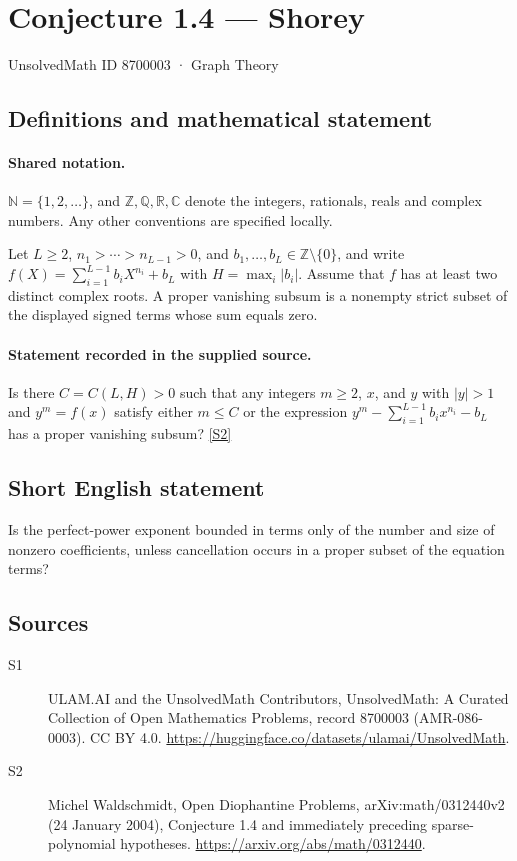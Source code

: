 \documentclass[11pt]{article}
\newcommand{\sref}[2]{\hyperlink{source:#1:#2}{[S#2]}}
\begin{document}
\setcounter{section}{8700002}
\section{Conjecture 1.4 — Shorey}\label{8700003}
{\small\sffamily UnsolvedMath ID 8700003 · Graph Theory}
\subsection{Definitions and mathematical statement}

\paragraph{Shared notation.}$\mathbb N=\{1,2,\ldots\}$, and $\mathbb Z,\mathbb Q,\mathbb R,\mathbb C$ denote the integers, rationals, reals and complex numbers. Any other conventions are specified locally.


Let $L\ge2$, $n_1>\cdots>n_{L-1}>0$, and $b_1,\ldots,b_L\in\mathbb Z\setminus\{0\}$, and write $f(X)=\sum_{i=1}^{L-1}b_iX^{n_i}+b_L$ with $H=\max_i|b_i|$. Assume that $f$ has at least two distinct complex roots. A proper vanishing subsum is a nonempty strict subset of the displayed signed terms whose sum equals zero.
\paragraph{Statement recorded in the supplied source.}
Is there $C=C(L,H)>0$ such that any integers $m\ge2$, $x$, and $y$ with $|y|>1$ and $y^m=f(x)$ satisfy either $m\le C$ or the expression $y^m-\sum_{i=1}^{L-1}b_i x^{n_i}-b_L$ has a proper vanishing subsum? \sref{8700003}{2}
\subsection{Short English statement}
Is the perfect-power exponent bounded in terms only of the number and size of nonzero coefficients, unless cancellation occurs in a proper subset of the equation terms?
\subsection{Sources}
\begin{description}
\item[\hypertarget{source:8700003:1}{S1}] ULAM.AI and the UnsolvedMath Contributors, UnsolvedMath: A Curated Collection of Open Mathematics Problems, record 8700003 (AMR-086-0003). CC BY 4.0. \url{https://huggingface.co/datasets/ulamai/UnsolvedMath}.
\item[\hypertarget{source:8700003:2}{S2}] Michel Waldschmidt, Open Diophantine Problems, arXiv:math/0312440v2 (24 January 2004), Conjecture 1.4 and immediately preceding sparse-polynomial hypotheses. \url{https://arxiv.org/abs/math/0312440}.
\end{description}
\label{end:8700003}
\end{document}
